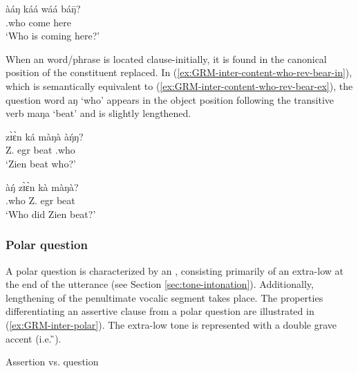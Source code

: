 \ex\label{ex:GRM-inter-content-who}
\gll àáŋ káá wáá báŋ̄?\\
{\q}.who  {\ipfv}  come here\\
\glt  `Who is coming here?'

\z 
 \z
 
When an  word/phrase is located clause-initially,  it is found in the canonical position of the constituent replaced. In (\ref{ex:GRM-inter-content-who-rev-bear-in}), which is semantically equivalent to  (\ref{ex:GRM-inter-content-who-rev-bear-ex}),  the question word {\sls aŋ} `who' appears in the object position following the transitive verb {\sls maŋa} `beat' and is slightly lengthened. 


\ea\label{ex:GRM-inter-content-who-rev-bear}

\begin{multicols}{2}
 \ea\label{ex:GRM-inter-content-who-rev-bear-in}
\gll  zɪ̀ɛ̀n ká màŋà àŋ́ŋ?\\
 Z.  {\sc egr} beat {\q}.who \\
 \glt  `Zien beat who?'

 \ex\label{ex:GRM-inter-content-who-rev-bear-ex}
\gll  àŋ́ zɪ̀ɛ̀n kà màŋà?\\
{\q}.who  Z. {\sc egr} beat\\
 \glt  `Who did Zien beat?'

\z 
\end{multicols}
 \z

 
\subsubsection{Polar question}
\label{sec:GRM-interr-polar}


A polar question is characterized by an  , consisting primarily of an extra-low  at the end of the utterance (see Section \ref{sec:tone-intonation}). Additionally, lengthening  of the penultimate vocalic segment takes place. The properties differentiating an assertive clause from a polar question are illustrated in (\ref{ex:GRM-inter-polar}). The extra-low tone is represented with a double grave accent (i.e.  ̏).


\ea\label{ex:GRM-inter-polar}{\rm Assertion vs. question}\\

